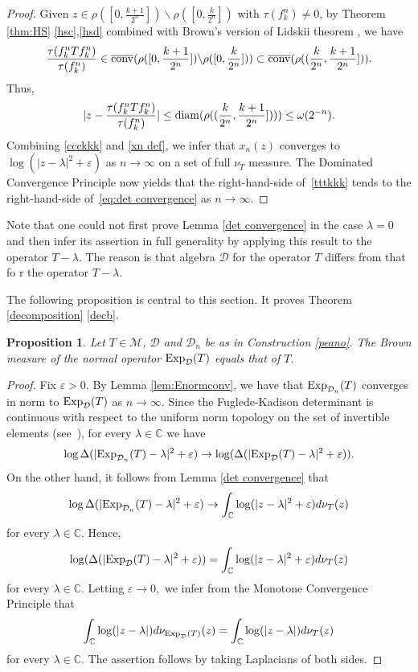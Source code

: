 \documentclass{amsart}
\theoremstyle{plain}
\newtheorem{prop}[thm]{Proposition}
\theoremstyle{remark}
\begin{document}
\begin{proof}
Given $z\in\rho([0,\frac{k+1}{2^n}])\backslash \rho([0,\frac{k}{2^n}])$ with $\tau(f^n_k)\ne0$,
by Theorem \ref{thm:HS} \eqref{hsc},\eqref{hsd} combined with Brown's version of Lidskii theorem \cite{Brown}, we have
$$\frac{\tau(f^n_kTf^n_k)}{\tau(f^n_k)}\in\overline{\rm conv}(\rho([0,\frac{k+1}{2^n}])\backslash \rho([0,\frac{k}{2^n}]))\subset\overline{\rm conv}(\rho((\frac{k}{2^n},\frac{k+1}{2^n}])).$$
Thus,
\begin{equation}\label{ccckkk}
|z-\frac{\tau(f^n_kTf^n_k)}{\tau(f^n_k)}|\leq{\rm diam}(\rho((\frac{k}{2^n},\frac{k+1}{2^n}])))\leq\omega(2^{-n}).
\end{equation}
Combining \eqref{ccckkk} and \eqref{xn def}, we infer that $x_n(z)$ converges to $\log(|z-\lambda|^2+\varepsilon)$
as $n\to\infty$ on a set of full $\nu_T$ measure.
The Dominated Convergence Principle now yields that the right-hand-side of~\eqref{tttkkk} tends to the right-hand-side
of~\eqref{eq:det convergence} as $n\to\infty$.
\end{proof}

Note that one could not first prove Lemma \ref{det convergence} in the case $\lambda=0$ and then infer its assertion in full generality by applying this result to the operator $T-\lambda.$ The reason is that algebra $\mathcal{D}$ for the operator $T$ differs from that fo r the operator $T-\lambda.$

The following proposition is central to this section. It proves Theorem \ref{decomposition} \eqref{decb}.

\begin{prop}\label{br equ} Let $T\in\mathcal{M}$, $\mathcal{D}$ and $\mathcal{D}_n$ be as in Construction \ref{peano}. The Brown measure of the normal operator ${\rm Exp}_{\mathcal{D}}(T)$ equals that of $T.$
\end{prop}
\begin{proof} Fix $\varepsilon>0.$ By Lemma \ref{lem:Enormconv}, we have that ${\rm Exp}_{\mathcal{D}_n}(T)$ converges in norm to ${\rm Exp}_{\mathcal{D}}(T)$ as $n\to\infty.$ Since the Fuglede-Kadison determinant is continuous with respect to the uniform norm topology on the set of invertible elements (see~\cite{FK}), for every $\lambda\in\mathbb{C}$ we have
$$\log\Delta(|{\rm Exp}_{\mathcal{D}_n}(T)-\lambda|^2+\varepsilon)\to\log(\Delta(|{\rm Exp}_{\mathcal{D}}(T)-\lambda|^2+\varepsilon)).$$
On the other hand, it follows from Lemma \ref{det convergence} that
$$\log\Delta(|{\rm Exp}_{\mathcal{D}_n}(T)-\lambda|^2+\varepsilon)\to\int_{\mathbb{C}}\log(|z-\lambda|^2+\varepsilon)d\nu_T(z)$$
for every $\lambda\in\mathbb{C}.$ Hence,
$$\log(\Delta(|{\rm Exp}_{\mathcal{D}}(T)-\lambda|^2+\varepsilon))=\int_{\mathbb{C}}\log(|z-\lambda|^2+\varepsilon)d\nu_T(z)$$
for every $\lambda\in\mathbb{C}.$ Letting $\varepsilon\to0,$ we infer from the Monotone Convergence Principle that
$$\int_{\mathbb{C}}\log(|z-\lambda|)d\nu_{{\rm Exp}_{\mathcal{D}}(T)}(z)=\int_{\mathbb{C}}\log(|z-\lambda|)d\nu_T(z)$$
for every $\lambda\in\mathbb{C}.$ The assertion follows by taking Laplacians of both sides.
\end{proof}
\end{document}
